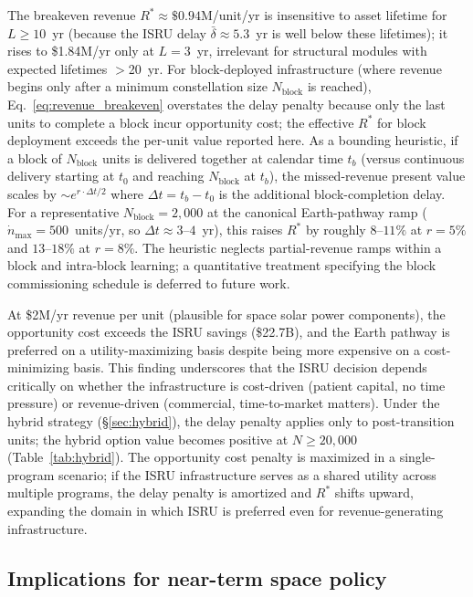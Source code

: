 The breakeven revenue $R^* \approx \$0.94$M/unit/yr is insensitive to asset lifetime for $L \geq 10$~yr (because the ISRU delay $\bar{\delta} \approx 5.3$~yr is well below these lifetimes); it rises to \$1.84M/yr only at $L = 3$~yr, irrelevant for structural modules with expected lifetimes $>$20~yr. For block-deployed infrastructure (where revenue begins only after a minimum constellation size $N_{\mathrm{block}}$ is reached), Eq.~\ref{eq:revenue_breakeven} overstates the delay penalty because only the last units to complete a block incur opportunity cost; the effective $R^*$ for block deployment exceeds the per-unit value reported here. As a bounding heuristic, if a block of $N_{\mathrm{block}}$ units is delivered together at calendar time $t_b$ (versus continuous delivery starting at $t_0$ and reaching $N_{\mathrm{block}}$ at $t_b$), the missed-revenue present value scales by $\sim e^{r \cdot \Delta t / 2}$ where $\Delta t = t_b - t_0$ is the additional block-completion delay. For a representative $N_{\mathrm{block}} = 2{,}000$ at the canonical Earth-pathway ramp ($\dot{n}_{\max} = 500$~units/yr, so $\Delta t \approx 3$--$4$~yr), this raises $R^*$ by roughly $8$--$11\%$ at $r = 5\%$ and $13$--$18\%$ at $r = 8\%$. The heuristic neglects partial-revenue ramps within a block and intra-block learning; a quantitative treatment specifying the block commissioning schedule is deferred to future work.

At \$2M/yr revenue per unit (plausible for space solar power components), the opportunity cost exceeds the ISRU savings (\$22.7B), and the Earth pathway is preferred on a utility-maximizing basis despite being more expensive on a cost-minimizing basis. This finding underscores that the ISRU decision depends critically on whether the infrastructure is cost-driven (patient capital, no time pressure) or revenue-driven (commercial, time-to-market matters). Under the hybrid strategy (\S\ref{sec:hybrid}), the delay penalty applies only to post-transition units; the hybrid option value becomes positive at $N \geq 20{,}000$ (Table~\ref{tab:hybrid}). The opportunity cost penalty is maximized in a single-program scenario; if the ISRU infrastructure serves as a shared utility across multiple programs, the delay penalty is amortized and $R^*$ shifts upward, expanding the domain in which ISRU is preferred even for revenue-generating infrastructure.

\subsection{Implications for near-term space policy}

